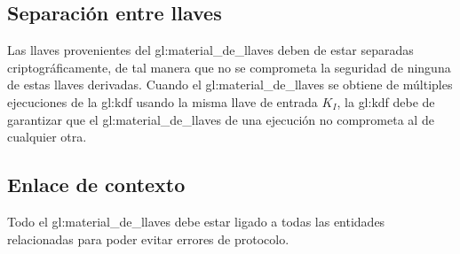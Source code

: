 \subsection{Separación entre llaves}
Las llaves provenientes del \gls{gl:material_de_llaves} deben de estar
separadas criptográficamente, de tal manera que no se comprometa la seguridad
de ninguna de estas llaves derivadas. Cuando el \gls{gl:material_de_llaves}
se obtiene de múltiples ejecuciones de la \gls{gl:kdf} usando la misma llave
de entrada $K_I$, la \gls{gl:kdf} debe de garantizar que el
\gls{gl:material_de_llaves} de una ejecución no comprometa al de cualquier
otra.

\subsection{Enlace de contexto}
Todo el \gls{gl:material_de_llaves} debe estar ligado a todas las entidades
relacionadas para poder evitar errores de protocolo.
